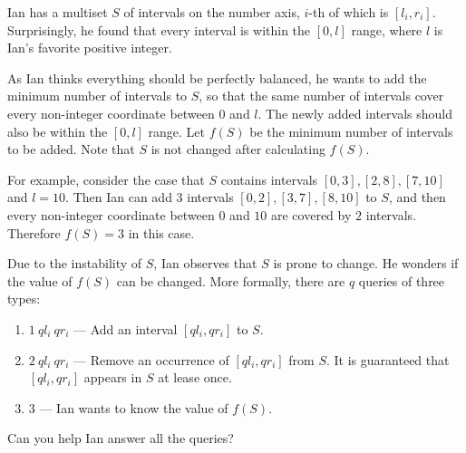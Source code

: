 Ian has a multiset $S$ of intervals on the number axis, $i$-th of which is $[l_i,r_i]$.
Surprisingly, he found that every interval is within the $[0,l]$ range, where $l$ is Ian's favorite positive integer.

As Ian thinks everything should be perfectly balanced, he wants to add the minimum number of intervals to $S$, so that the same number of intervals cover every non-integer coordinate between $0$ and $l$.
The newly added intervals should also be within the $[0,l]$ range.
Let $f(S)$ be the minimum number of intervals to be added.
Note that $S$ is not changed after calculating $f(S)$.

For example, consider the case that $S$ contains intervals $[0,3], [2,8], [7,10]$ and $l=10$.
Then Ian can add $3$ intervals $[0,2],[3,7],[8,10]$ to $S$, and then every non-integer coordinate between $0$ and $10$ are covered by $2$ intervals.
Therefore $f(S) = 3$ in this case.

Due to the instability of $S$, Ian observes that $S$ is prone to change.
He wonders if the value of $f(S)$ can be changed.
More formally, there are $q$ queries of three types:

\begin{enumerate}
\item $1\ ql_i\ qr_i$ — Add an interval $[ql_i,qr_i]$ to $S$.
\item $2\ ql_i\ qr_i$ — Remove an occurrence of $[ql_i,qr_i]$ from $S$. It is guaranteed that $[ql_i,qr_i]$ appears in $S$ at lease once.
\item $3$ — Ian wants to know the value of $f(S)$.
\end{enumerate}

Can you help Ian answer all the queries?